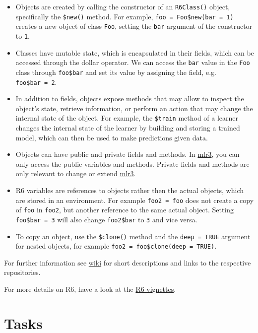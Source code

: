 \documentclass[]{scrbook}
\providecommand{\tightlist}{%
  \setlength{\itemsep}{0pt}\setlength{\parskip}{0pt}}
\begin{document}
\begin{itemize}
\tightlist
\item
  Objects are created by calling the constructor of an \texttt{R6Class()} object, specifically the \texttt{\$new()} method.
  For example, \texttt{foo\ =\ Foo\$new(bar\ =\ 1)} creates a new object of class \texttt{Foo}, setting the \texttt{bar} argument of the constructor to \texttt{1}.
\item
  Classes have mutable state, which is encapsulated in their fields, which can be accessed through the dollar operator.
  We can access the \texttt{bar} value in the \texttt{Foo} class through \texttt{foo\$bar} and set its value by assigning the field, e.g. \texttt{foo\$bar\ =\ 2}.
\item
  In addition to fields, objects expose methods that may allow to inspect the object's state, retrieve information, or perform an action that may change the internal state of the object.
  For example, the \texttt{\$train} method of a learner changes the internal state of the learner by building and storing a trained model, which can then be used to make predictions given data.
\item
  Objects can have public and private fields and methods.
  In \href{https://mlr3.mlr-org.com}{mlr3}, you can only access the public variables and methods.
  Private fields and methods are only relevant to change or extend \href{https://mlr3.mlr-org.com}{mlr3}.
\item
  R6 variables are references to objects rather then the actual objects, which are stored in an environment.
  For example \texttt{foo2\ =\ foo} does not create a copy of \texttt{foo} in \texttt{foo2}, but another reference to the same actual object.
  Setting \texttt{foo\$bar\ =\ 3} will also change \texttt{foo2\$bar} to \texttt{3} and vice versa.
\item
  To copy an object, use the \texttt{\$clone()} method and the \texttt{deep\ =\ TRUE} argument for nested objects, for example \texttt{foo2\ =\ foo\$clone(deep\ =\ TRUE)}.
\end{itemize}

For further information see \href{https://github.com/mlr-org/mlr3/wiki/Extension-Packages}{wiki} for short descriptions and links to the respective repositories.

For more details on R6, have a look at the \href{https://r6.r-lib.org/}{R6 vignettes}.

\hypertarget{tasks}{%
\section{Tasks}\label{tasks}}
\end{document}
